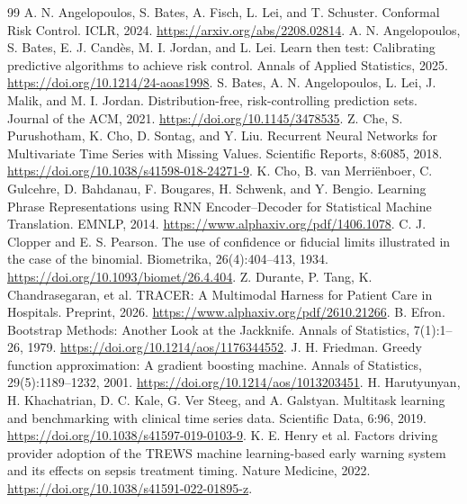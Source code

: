 \begin{thebibliography}{99}
 A. N. Angelopoulos, S. Bates, A. Fisch, L. Lei, and T. Schuster. Conformal Risk Control. ICLR, 2024. \url{https://arxiv.org/abs/2208.02814}.
 A. N. Angelopoulos, S. Bates, E. J. Cand\`es, M. I. Jordan, and L. Lei. Learn then test: Calibrating predictive algorithms to achieve risk control. Annals of Applied Statistics, 2025. \url{https://doi.org/10.1214/24-aoas1998}.
 S. Bates, A. N. Angelopoulos, L. Lei, J. Malik, and M. I. Jordan. Distribution-free, risk-controlling prediction sets. Journal of the ACM, 2021. \url{https://doi.org/10.1145/3478535}.
 Z. Che, S. Purushotham, K. Cho, D. Sontag, and Y. Liu. Recurrent Neural Networks for Multivariate Time Series with Missing Values. Scientific Reports, 8:6085, 2018. \url{https://doi.org/10.1038/s41598-018-24271-9}.
 K. Cho, B. van Merri\"enboer, C. Gulcehre, D. Bahdanau, F. Bougares, H. Schwenk, and Y. Bengio. Learning Phrase Representations using RNN Encoder--Decoder for Statistical Machine Translation. EMNLP, 2014. \url{https://www.alphaxiv.org/pdf/1406.1078}.
 C. J. Clopper and E. S. Pearson. The use of confidence or fiducial limits illustrated in the case of the binomial. Biometrika, 26(4):404--413, 1934. \url{https://doi.org/10.1093/biomet/26.4.404}.
 Z. Durante, P. Tang, K. Chandrasegaran, et al. TRACER: A Multimodal Harness for Patient Care in Hospitals. Preprint, 2026. \url{https://www.alphaxiv.org/pdf/2610.21266}.
 B. Efron. Bootstrap Methods: Another Look at the Jackknife. Annals of Statistics, 7(1):1--26, 1979. \url{https://doi.org/10.1214/aos/1176344552}.
 J. H. Friedman. Greedy function approximation: A gradient boosting machine. Annals of Statistics, 29(5):1189--1232, 2001. \url{https://doi.org/10.1214/aos/1013203451}.
 H. Harutyunyan, H. Khachatrian, D. C. Kale, G. Ver Steeg, and A. Galstyan. Multitask learning and benchmarking with clinical time series data. Scientific Data, 6:96, 2019. \url{https://doi.org/10.1038/s41597-019-0103-9}.
 K. E. Henry et al. Factors driving provider adoption of the TREWS machine learning-based early warning system and its effects on sepsis treatment timing. Nature Medicine, 2022. \url{https://doi.org/10.1038/s41591-022-01895-z}.

\end{thebibliography}
